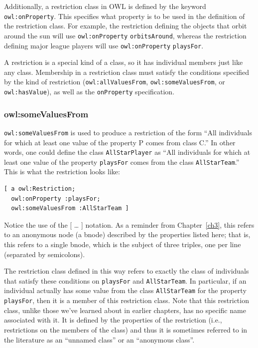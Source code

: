 Additionally, a restriction class in OWL is defined by the keyword
\texttt{owl:onProperty}. This specifies what property is to be used in the
definition of the restriction class. For example, the restriction
defining the objects that orbit around the sun will use \texttt{owl:onProperty}
\texttt{orbitsAround}, whereas the restriction defining major league players will
use \texttt{owl:onProperty} \texttt{playsFor}.

A restriction is a special kind of a class, so it has individual members
just like any class.
Membership in a restriction class must satisfy the conditions specified
by the kind of restriction (\texttt{owl:allValuesFrom}, \texttt{owl:someValuesFrom}, or
\texttt{owl:hasValue}), as well as the \texttt{onProperty} specification.

\subsubsection{owl:someValuesFrom}
\label{ch12.somevaluesfrom}
\texttt{owl:someValuesFrom} is used to produce a restriction of the form ``All
individuals for which at least one value of the property P comes from
class C.'' In other words, one could define the class
\texttt{AllStarPlayer} as ``All individuals for which at least one value of the
property \texttt{playsFor} comes from the class \texttt{AllStarTeam}.'' This is what the
restriction looks like:

\begin{lstlisting}
[ a owl:Restriction;
  owl:onProperty :playsFor; 
  owl:someValuesFrom :AllStarTeam ]
\end{lstlisting}

Notice the use of the {[} \ldots{} {]} notation. As a reminder from
Chapter~\ref{ch3}, this refers to an anonymous node (a bnode) described by the
properties listed here; that is, this refers to a single bnode, which is
the subject of three triples, one per line (separated by semicolons).

The restriction class defined in this way refers to exactly the class of
individuals that satisfy these conditions on \texttt{playsFor} and \texttt{AllStarTeam}.
In particular, if an individual actually has some value from the class
\texttt{AllStarTeam} for the property \texttt{playsFor}, then it is a member of this
restriction class. Note that this restriction class, unlike those we've
learned about in earlier chapters, has no specific name associated with
it. It is defined by the properties of the restriction (i.e.,
restrictions on the members of the class) and thus it is sometimes
referred to in the literature as an ``unnamed class'' or an ``anonymous class''.

